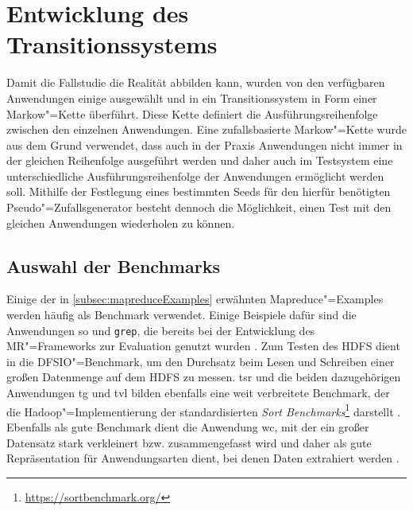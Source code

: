 \section{Entwicklung des Transitionssystems}
\label{sec:transitionsystem}

Damit die Fallstudie die Realität abbilden kann, wurden von den verfügbaren Anwendungen einige ausgewählt und in ein Transitionssystem in Form einer Markow"=Kette überführt.
Diese Kette definiert die Ausführungsreihenfolge zwischen den einzelnen Anwendungen.
Eine zufallsbasierte Markow"=Kette wurde aus dem Grund verwendet, dass auch in der Praxis Anwendungen nicht immer in der gleichen Reihenfolge ausgeführt werden und daher auch im Testsystem eine unterschiedliche Ausführungsreihenfolge der Anwendungen ermöglicht werden soll.
Mithilfe der Festlegung eines bestimmten Seeds für den hierfür benötigten Pseudo"=Zufallsgenerator besteht dennoch die Möglichkeit, einen Test mit den gleichen Anwendungen wiederholen zu können.

\subsection{Auswahl der Benchmarks}
\label{subsec:appSelection}

Einige der in \cref{subsec:mapreduceExamples} erwähnten Mapreduce"=Examples werden häufig als Benchmark verwendet.
Einige Beispiele dafür sind die Anwendungen \acrlong{so} und \texttt{grep}, die bereits bei der Entwicklung des \gls{MR}"=Frameworks zur Evaluation genutzt wurden \cite{Dean2004}.
Zum Testen des HDFS dient in \cite{Shvachko2010} die DFSIO"=Benchmark, um den Durchsatz beim Lesen und Schreiben einer großen Datenmenge auf dem HDFS zu messen.
\acrlong{tsr} und die beiden dazugehörigen Anwendungen \acrlong{tg} und \acrlong{tvl} bilden ebenfalls eine weit verbreitete Benchmark, der die Hadoop"=Implementierung der standardisierten \emph{Sort Benchmarks}\footnote{\url{https://sortbenchmark.org/}} darstellt \cite{Graves2013}.
Ebenfalls als gute Benchmark dient die Anwendung \acrlong{wc}, mit der ein großer Datensatz stark verkleinert bzw. zusammengefasst wird und daher als gute Repräsentation für Anwendungsarten dient, bei denen Daten extrahiert werden \cite{Huang2010,Chen2012}.

